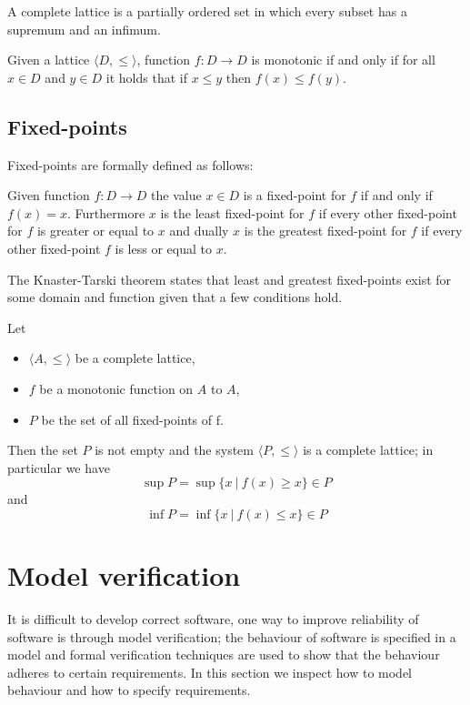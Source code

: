 \begin{definition}
	A complete lattice is a partially ordered set in which every subset has a supremum and an infimum.
\end{definition}

\begin{definition}
	Given a lattice $\langle D, \leq \rangle$, function $f : D \rightarrow D$ is monotonic if and only if for all $x \in D$ and $y \in D$ it holds that if $x \leq y$ then $f(x) \leq f(y)$.
\end{definition}
\subsection{Fixed-points}
Fixed-points are formally defined as follows:
\begin{definition}
	Given function $f : D \rightarrow D$ the value $x \in D$ is a fixed-point for $f$ if and only if $f(x) = x$. Furthermore $x$ is the least fixed-point for $f$ if every other fixed-point for $f$ is greater or equal to $x$ and dually $x$ is the greatest fixed-point for $f$ if every other fixed-point $f$ is less or equal to $x$.
\end{definition}
The Knaster-Tarski theorem states that least and greatest fixed-points exist for some domain and function given that a few conditions hold.
\begin{theorem}
	\label{the_knaster_tarski}
	Let
	\begin{itemize}
		\item $\langle A, \leq \rangle$ be a complete lattice,
		\item $f$ be a monotonic function on $A$ to $A$,
		\item $P$ be the set of all fixed-points of f.
	\end{itemize}
	Then the set $P$ is not empty and the system $\langle P, \leq \rangle$ is a complete lattice; in particular we have 
	\[ \sup P = \sup \{ x\ |\ f(x) \geq x \} \in P \]
	and
	\[ \inf P = \inf \{ x\ |\ f(x) \leq x \} \in P \]
\end{theorem}

\section{Model verification}
It is difficult to develop correct software, one way to improve reliability of software is through model verification; the behaviour of software is specified in a model and formal verification techniques are used to show that the behaviour adheres to certain requirements. In this section we inspect how to model behaviour and how to specify requirements.

